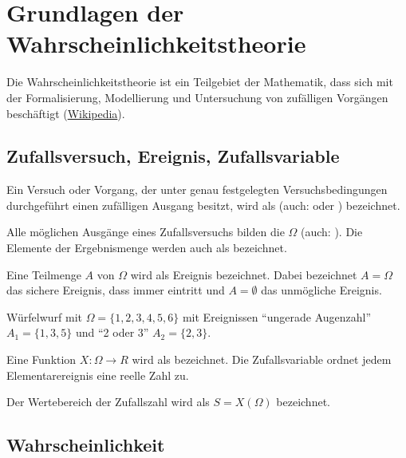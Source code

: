 \chapter{Grundlagen der Wahrscheinlichkeitstheorie}

Die Wahrscheinlichkeitstheorie ist ein Teilgebiet der Mathematik, dass sich mit
der Formalisierung, Modellierung und Untersuchung von zufälligen Vorgängen
beschäftigt (\href{https://de.wikipedia.org/wiki/Wahrscheinlichkeitstheorie}
{Wikipedia}).

\section{Zufallsversuch, Ereignis, Zufallsvariable}

\begin{definition}[Zufallsversuch]
Ein Versuch oder Vorgang, der unter genau festgelegten Versuchsbedingungen
durchgeführt einen zufälligen Ausgang besitzt, wird als 
(auch:  oder )
bezeichnet.
\end{definition}

\begin{definition}[Ergebnismenge]
Alle möglichen Ausgänge eines Zufallsversuchs bilden die 
$\Omega$ (auch: ). Die Elemente der Ergebnismenge werden auch als
 bezeichnet.
\end{definition}

\begin{definition}[Ereignis]
Eine Teilmenge $A$ von $\Omega$ wird als Ereignis bezeichnet. Dabei bezeichnet
$A = \Omega$ das sichere Ereignis, dass immer eintritt und $A = \emptyset$ das
unmögliche Ereignis.
\end{definition}

 Würfelwurf mit $\Omega = \{1,2,3,4,5,6\}$ mit Ereignissen
"`ungerade Augenzahl"' $A_1 = \{1,3,5\}$ und "`2 oder 3"' $A_2 = \{2,3\}$.

\begin{definition}[Zufallsvariable]
Eine Funktion $X: \Omega \to R$ wird als 
bezeichnet. Die Zufallsvariable ordnet jedem Elementarereignis eine reelle Zahl
zu.

Der Wertebereich der Zufallszahl wird als  $S = X(\Omega)$
bezeichnet.
\end{definition}

\section{Wahrscheinlichkeit}

